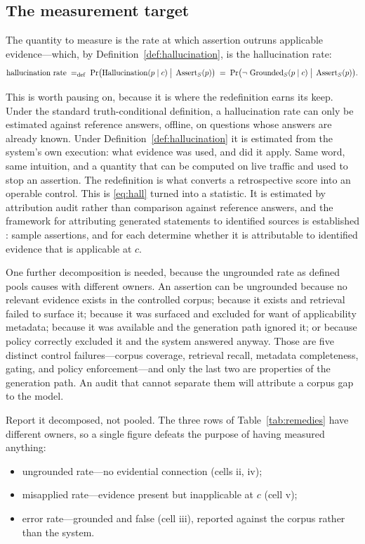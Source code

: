 \subsection{The measurement target}

The quantity to measure is the rate at which assertion outruns applicable
evidence---which, by Definition~\ref{def:hallucination}, is the hallucination rate:
\begin{equation}
  \text{hallucination rate}
  \;=_{\mathrm{def}}\;
  \Pr\bigl(\operatorname{Hallucination}(p \mid c) \;\big|\; \operatorname{Assert}_S(p)\bigr)
  \;=\;
  \Pr\bigl(\neg\,\operatorname{Grounded}_S(p \mid c) \;\big|\; \operatorname{Assert}_S(p)\bigr).
  \label{eq:rate}
\end{equation}

This is worth pausing on, because it is where the redefinition earns its keep. Under
the standard truth-conditional definition, a hallucination rate can only be
estimated against reference answers, offline, on questions whose answers are already
known. Under Definition~\ref{def:hallucination} it is estimated from the system's own
execution: what evidence was used, and did it apply. Same word, same intuition, and a
quantity that can be computed on live traffic and used to stop an assertion. The
redefinition is what converts a retrospective score into an operable control.
This is \eqref{eq:hall} turned into a statistic. It is estimated by attribution
audit rather than comparison against reference answers, and the framework for attributing
generated statements to identified sources is established
\citep{rashkin2023}: sample assertions, and for each determine whether it is
attributable to identified evidence that is applicable at $c$.

One further decomposition is needed, because the ungrounded rate as defined pools
causes with different owners. An assertion can be ungrounded because no relevant
evidence exists in the controlled corpus; because it exists and retrieval failed to
surface it; because it was surfaced and excluded for want of applicability metadata;
because it was available and the generation path ignored it; or because policy
correctly excluded it and the system answered anyway. Those are five distinct control
failures---corpus coverage, retrieval recall, metadata completeness, gating, and policy
enforcement---and only the last two are properties of the generation path. An audit
that cannot separate them will attribute a corpus gap to the model.

Report it decomposed, not pooled. The three rows of
Table~\ref{tab:remedies} have different owners, so a single figure defeats the
purpose of having measured anything:
\begin{itemize}
  \item ungrounded rate---no evidential connection (cells ii, iv);
  \item misapplied rate---evidence present but inapplicable at $c$ (cell v);
  \item error rate---grounded and false (cell iii), reported against the corpus
        rather than the system.
\end{itemize}

